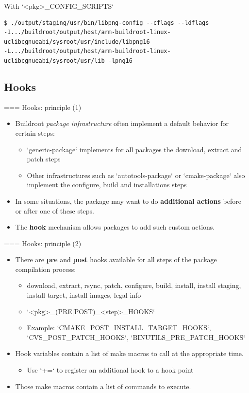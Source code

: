 \begin{block}{With `<pkg>_CONFIG_SCRIPTS`}
{\tiny
  \begin{verbatim}
$ ./output/staging/usr/bin/libpng-config --cflags --ldflags
-I.../buildroot/output/host/arm-buildroot-linux-uclibcgnueabi/sysroot/usr/include/libpng16
-L.../buildroot/output/host/arm-buildroot-linux-uclibcgnueabi/sysroot/usr/lib -lpng16
  \end{verbatim}}
\end{block}



\subsection{Hooks}

=== {Hooks: principle (1)}
  \begin{itemize}
  \item Buildroot {\em package infrastructure} often implement a
    default behavior for certain steps:
    \begin{itemize}
    \item `generic-package` implements for all packages the
      download, extract and patch steps
    \item Other infrastructures such as `autotools-package` or
      `cmake-package` also implement the configure, build and
      installations steps
    \end{itemize}
  \item In some situations, the package may want to do {\bf additional
      actions} before or after one of these steps.
  \item The {\bf hook} mechanism allows packages to add such custom
    actions.
  \end{itemize}


=== {Hooks: principle (2)}
  \begin{itemize}
  \item There are {\bf pre} and {\bf post} hooks available for all
    steps of the package compilation process:
    \begin{itemize}
    \item download, extract, rsync, patch, configure, build, install,
      install staging, install target, install images, legal info
    \item `<pkg>_(PRE|POST)_<step>_HOOKS`
    \item Example: `CMAKE_POST_INSTALL_TARGET_HOOKS`,
      `CVS_POST_PATCH_HOOKS`, `BINUTILS_PRE_PATCH_HOOKS`
    \end{itemize}
  \item Hook variables contain a list of make macros to call at the
    appropriate time.
    \begin{itemize}
    \item Use `+=` to register an additional hook to a hook point
    \end{itemize}
  \item Those make macros contain a list of commands to execute.
  \end{itemize}


